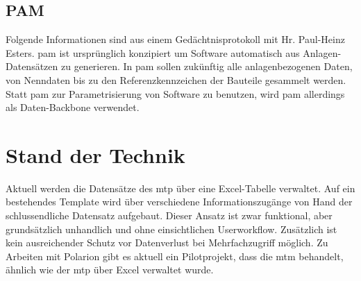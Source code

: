 \subsection{PAM}
\label{sub:pam}
Folgende Informationen sind aus einem Gedächtnisprotokoll mit Hr. Paul-Heinz Esters. \ac{pam} ist ursprünglich konzipiert um Software automatisch aus Anlagen-Datensätzen zu generieren. In \ac{pam} sollen zukünftig alle anlagenbezogenen Daten, von Nenndaten bis zu den Referenzkennzeichen der Bauteile gesammelt werden. Statt \ac{pam} zur Parametrisierung von Software zu benutzen, wird \ac{pam} allerdings als Daten-Backbone verwendet. 
\section{Stand der Technik}
\label{sec:stand}
Aktuell werden die Datensätze des \ac{mtp} über eine Excel-Tabelle verwaltet. Auf ein bestehendes Template wird über verschiedene Informationszugänge von Hand der schlussendliche Datensatz aufgebaut. Dieser Ansatz ist zwar funktional, aber grundsätzlich unhandlich und ohne einsichtlichen Userworkflow. Zusätzlich ist kein ausreichender Schutz vor Datenverlust bei Mehrfachzugriff möglich. 
Zu Arbeiten mit Polarion gibt es aktuell ein Pilotprojekt, dass die \ac{mtm} behandelt, ähnlich wie der \ac{mtp} über Excel verwaltet wurde.




